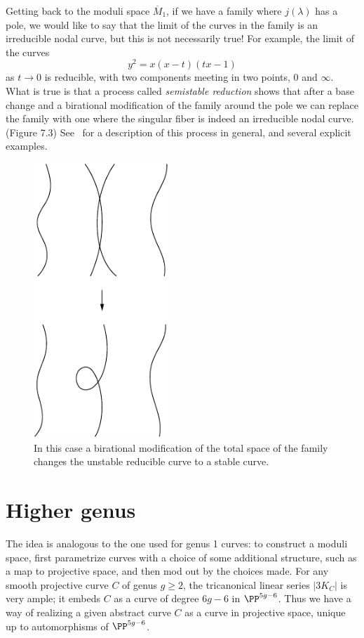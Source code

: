 Getting back to the moduli space $\overline M_1$, if we have a family where
$j(\lambda)$ has a pole, we would like to say that the limit of the curves in the family is an irreducible nodal curve,
but this is not necessarily true! For example, the limit of the curves
$$
y^2 = x(x-t)(tx-1)
$$
as $t \to 0$ is reducible, with two components meeting in two points, 0 and $\infty$.
What is true is that a process called \emph{semistable reduction} shows that after a base change and a birational
modification of the family around the pole we can replace the family with one where the singular fiber
is indeed an irreducible nodal curve. (Figure 7.3) See~\cite{MR1631825} for a description of this process in general, and several explicit examples.

\begin{figure}
\inprogress
\centerline{\includegraphics[width=2in]{"main/Fig07-1"}}
\caption{In this case a birational modification of the total space of the family changes the unstable reducible curve to a stable curve.}
\label{default}
\end{figure}

\section{Higher genus}

The  idea  is  analogous to the one used  for genus 1 curves: to construct a moduli space, first parametrize curves with a choice of some additional structure, such as a map to projective space, and then mod out by the choices made. For any smooth projective curve $C$ of genus $g\geq 2$, the tricanonical linear series $|3K_C|$ is very ample; it embeds $C$ as a curve of degree $6g-6$ in $\PP^{5g-6}$. Thus we have a way of realizing a given abstract curve $C$ as a curve in projective space, unique up to automorphisms of $\PP^{5g-6}$.

